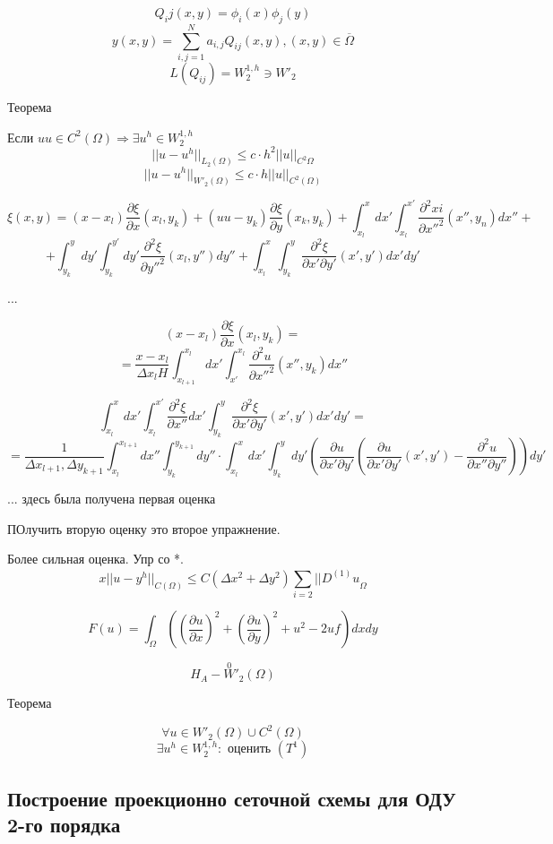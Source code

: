 \documentclass[12pt, a4paper]{article}
\begin{document}
\[ Q_ij(x, y) = \phi_i(x) \phi_j(y) \]
\[ y(x, y) = \sum_{i, j=1}^{N}a_{i, j} Q_{ij}(x, y), (x, y) \in \overline{\Omega} \]
\[ L(Q_{ij}) = W_2^{1, h} \owns {W'}_2 \]

Теорема

Если $ uu \in C^2 (\Omega) \Rightarrow \exists u^h \in W^{1, h}_2$
\[ {||u - u^h||}_{L_2(\Omega)} \leq c\cdot h^2 {||u||}_{C^2\Omega} \]
\[ {||u-u^h||}_{{W'}_2(\Omega)} \leq c \cdot h {|| u ||}_{C^2(\Omega)} \]

\[ \xi(x, y) = (x - x_l) \frac{\partial \xi}{\partial x} (x_l, y_k) + (uu - y_k) \frac{\partial \xi}{\partial y} (x_k, y_k) + \int_{x_l}^{x} dx' \int_{x_l}^{x'} \frac{\partial ^2 xi}{\partial {x''}^2} (x'', y_n) dx'' + \]
\[ + \int_{y_k}^{y}dy' \int_{y_k}^{y'}dy' \frac{\partial ^2 \xi}{\partial {y''}^2}(x_l, y'') d y'' + \int_{x_l}^{x} \int_{y_k}^{y} \frac{\partial ^2 \xi}{\partial x' \partial y'} (x', y') dx' dy'  \]

...

\[ (x - x_l) \frac{\partial \xi}{\partial x}(x_l, y_k) =  \]
\[ = \frac{x-x_l}{\Delta x_l H} \int_{x_{l+1}}^{x_l} dx' \int_{x'}^{x_l} \frac{\partial ^2 u}{\partial {x''}^2} (x'', y_k) dx'' \]

\[ \int_{x_l}^{x} dx' \int_{x_l}^{x'} \frac{\partial ^2 \xi}{\partial {x''}} dx' \int_{y_k}^{y} \frac{\partial ^2 \xi}{\partial x' \partial y'} (x', y') dx' dy' = \]
\[ = \frac{1}{\Delta x_{l+1}, \Delta y_{k+1}} \int_{x_l}^{x_{l+1}} dx'' \int_{y_k}^{y_{k+1}} dy'' \cdot \int_{x_l}^{x} dx' \int_{y_k}^{y} d y' (\frac{\partial u}{\partial x' \partial  y'}( \frac{\partial u}{\partial x' \partial y'}(x', y') - \frac{\partial ^2 u}{\partial x''\partial y''})) dy' \]

...
здесь была получена первая оценка

ПОлучить вторую оценку это второе упражнение.

Более сильная оценка. Упр со *.
\[ x {||u - y^h||}_{C(\Omega)} \leq C (\Delta x^2 + \Delta y^2) \sum_{i=2}^{} {||D^{(1)} u}_{\Omega}\]

\[ F(u) = \int_{\Omega}^{} ((\frac{\partial u}{\partial x})^2 + (\frac{\partial u}{\partial y})^2 + u^2 - 2uf) dx dy \]

\[ H_A - {\overset{0}{W}'}_2( \Omega) \]

Теорема

\[ \forall u \in W'_2 (\Omega) \cup C^2(\Omega) \]
\[ \exists u^h \in W_2^{1, h} : \textrm{ оценить } (T^1) \]

\subsection{Построение проекционно сеточной схемы для ОДУ 2-го порядка}
\end{document}
